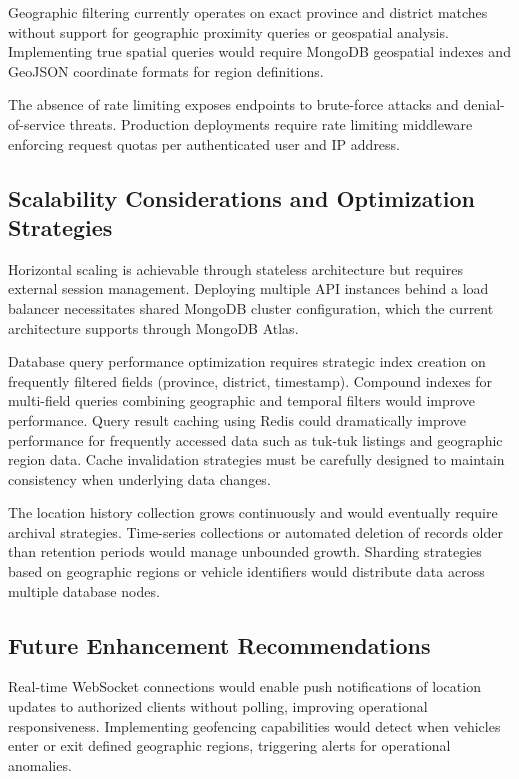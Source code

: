 \documentclass[12pt,a4paper]{article}
\begin{document}
Geographic filtering currently operates on exact province and district matches without support for geographic proximity queries or geospatial analysis. Implementing true spatial queries would require MongoDB geospatial indexes and GeoJSON coordinate formats for region definitions.

The absence of rate limiting exposes endpoints to brute-force attacks and denial-of-service threats. Production deployments require rate limiting middleware enforcing request quotas per authenticated user and IP address.

\subsection{Scalability Considerations and Optimization Strategies}

Horizontal scaling is achievable through stateless architecture but requires external session management. Deploying multiple API instances behind a load balancer necessitates shared MongoDB cluster configuration, which the current architecture supports through MongoDB Atlas.

Database query performance optimization requires strategic index creation on frequently filtered fields (province, district, timestamp). Compound indexes for multi-field queries combining geographic and temporal filters would improve performance. Query result caching using Redis could dramatically improve performance for frequently accessed data such as tuk-tuk listings and geographic region data. Cache invalidation strategies must be carefully designed to maintain consistency when underlying data changes.

The location history collection grows continuously and would eventually require archival strategies. Time-series collections or automated deletion of records older than retention periods would manage unbounded growth. Sharding strategies based on geographic regions or vehicle identifiers would distribute data across multiple database nodes.

\subsection{Future Enhancement Recommendations}

Real-time WebSocket connections would enable push notifications of location updates to authorized clients without polling, improving operational responsiveness. Implementing geofencing capabilities would detect when vehicles enter or exit defined geographic regions, triggering alerts for operational anomalies.
\end{document}
